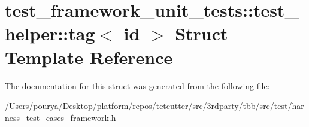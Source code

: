 \hypertarget{structtest__framework__unit__tests_1_1test__helper_1_1tag}{}\section{test\+\_\+framework\+\_\+unit\+\_\+tests\+:\+:test\+\_\+helper\+:\+:tag$<$ id $>$ Struct Template Reference}
\label{structtest__framework__unit__tests_1_1test__helper_1_1tag}


The documentation for this struct was generated from the following file\+:\begin{DoxyCompactItemize}
\item 
/\+Users/pourya/\+Desktop/platform/repos/tetcutter/src/3rdparty/tbb/src/test/harness\+\_\+test\+\_\+cases\+\_\+framework.\+h\end{DoxyCompactItemize}
